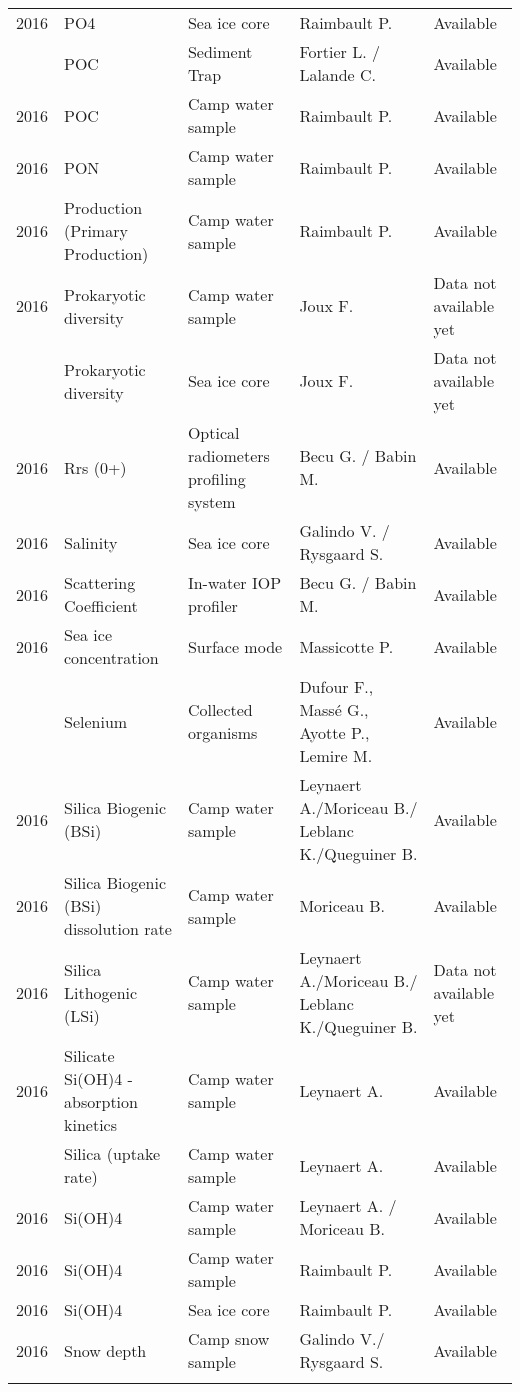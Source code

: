\documentclass[]{article}
\begin{document}
\begin{landscape}
\begin{longtable}{rllll}
2016 & PO4 & Sea ice core & Raimbault P. & Available\\
\addlinespace
2016 & POC & Sediment Trap & Fortier L. / Lalande C. & Available\\
2016 & POC & Camp water sample & Raimbault P. & Available\\
2016 & PON & Camp water sample & Raimbault P. & Available\\
2016 & Production (Primary Production) & Camp water sample & Raimbault P. & Available\\
2016 & Prokaryotic diversity & Camp water sample & Joux F. & Data not available yet\\
\addlinespace
2016 & Prokaryotic diversity & Sea ice core & Joux F. & Data not available yet\\
2016 & Rrs (0+) & Optical radiometers profiling system & Becu G. / Babin M. & Available\\
2016 & Salinity & Sea ice core & Galindo V. / Rysgaard S. & Available\\
2016 & Scattering Coefficient & In-water IOP profiler & Becu G. / Babin M. & Available\\
2016 & Sea ice concentration & Surface mode & Massicotte P. & Available\\
\addlinespace
2016 & Selenium & Collected organisms & Dufour F., Massé G., Ayotte P., Lemire M. & Available\\
2016 & Silica Biogenic (BSi) & Camp water sample & Leynaert A./Moriceau B./ Leblanc K./Queguiner B. & Available\\
2016 & Silica Biogenic (BSi) dissolution rate & Camp water sample & Moriceau B. & Available\\
2016 & Silica Lithogenic (LSi) & Camp water sample & Leynaert A./Moriceau B./ Leblanc K./Queguiner B. & Data not available yet\\
2016 & Silicate Si(OH)4 - absorption kinetics & Camp water sample & Leynaert A. & Available\\
\addlinespace
2016 & Silica (uptake rate) & Camp water sample & Leynaert A. & Available\\
2016 & Si(OH)4 & Camp water sample & Leynaert A. / Moriceau B. & Available\\
2016 & Si(OH)4 & Camp water sample & Raimbault P. & Available\\
2016 & Si(OH)4 & Sea ice core & Raimbault P. & Available\\
2016 & Snow depth & Camp snow sample & Galindo V./ Rysgaard S. & Available\\
\addlinespace

\end{longtable}
\end{landscape}
\end{document}
